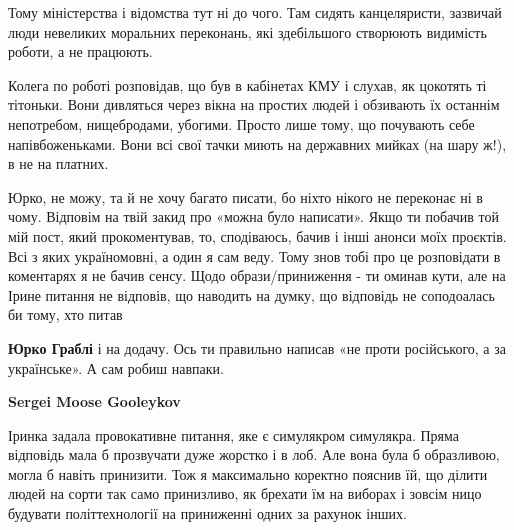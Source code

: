 \begin{itemize}
\begin{itemize}
Тому міністерства і відомства тут ні до чого. Там сидять канцеляристи, зазвичай
люди невеликих моральних переконань, які здебільшого створюють видимість
роботи, а не працюють.

Колега по роботі розповідав, що був в кабінетах КМУ і слухав, як цокотять ті
тітоньки. Вони дивляться через вікна на простих людей і обзивають їх останнім
непотребом, нищебродами, убогими. Просто лише тому, що почувають себе
напівбоженьками. Вони всі свої тачки миють на державних мийках (на шару ж!), в
не на платних.


 

Юрко, не можу, та й не хочу багато писати, бо ніхто нікого не переконає ні в
чому. Відповім на твій закид про «можна було написати». Якщо ти побачив той мій
пост, який прокоментував, то, сподіваюсь, бачив і інші анонси моїх проєктів.
Всі з яких україномовні, а один я сам веду. Тому знов тобі про це розповідати в
коментарях я не бачив сенсу. Щодо образи/приниження - ти оминав кути, але на
Ірине питання не відповів, що наводить на думку, що відповідь не соподоалась би
тому, хто питав \Smiley[1.0][yellow]


 
\textbf{Юрко Граблі} і на додачу. Ось ти правильно написав «не проти російського, а за українське». А сам робиш навпаки.

 
\textbf{Sergei Moose Gooleykov} 

Іринка задала провокативне питання, яке є симулякром симулякра. Пряма відповідь
мала б прозвучати дуже жорстко і в лоб. Але вона була б образливою, могла б
навіть принизити. Тож я максимально коректно пояснив їй, що ділити людей на
сорти так само принизливо, як брехати їм на виборах і зовсім ницо будувати
політтехнології на приниженні одних за рахунок інших. 


\end{itemize}
\end{itemize}
